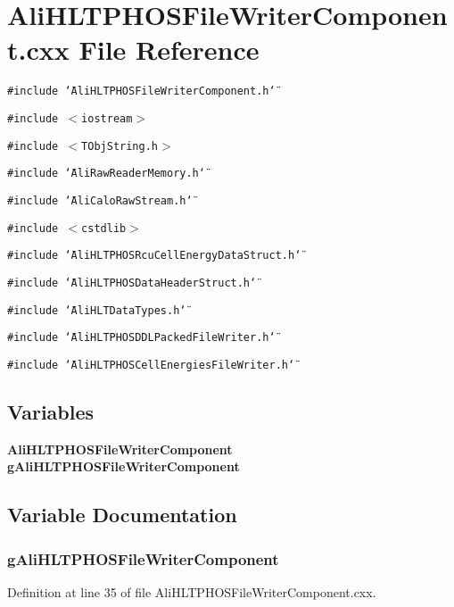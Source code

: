 \section{Ali\-HLTPHOSFile\-Writer\-Component.cxx File Reference}
\label{AliHLTPHOSFileWriterComponent_8cxx}


{\tt \#include \char`\"{}Ali\-HLTPHOSFile\-Writer\-Component.h\char`\"{}}\par
{\tt \#include $<$iostream$>$}\par
{\tt \#include $<$TObj\-String.h$>$}\par
{\tt \#include \char`\"{}Ali\-Raw\-Reader\-Memory.h\char`\"{}}\par
{\tt \#include \char`\"{}Ali\-Calo\-Raw\-Stream.h\char`\"{}}\par
{\tt \#include $<$cstdlib$>$}\par
{\tt \#include \char`\"{}Ali\-HLTPHOSRcu\-Cell\-Energy\-Data\-Struct.h\char`\"{}}\par
{\tt \#include \char`\"{}Ali\-HLTPHOSData\-Header\-Struct.h\char`\"{}}\par
{\tt \#include \char`\"{}Ali\-HLTData\-Types.h\char`\"{}}\par
{\tt \#include \char`\"{}Ali\-HLTPHOSDDLPacked\-File\-Writer.h\char`\"{}}\par
{\tt \#include \char`\"{}Ali\-HLTPHOSCell\-Energies\-File\-Writer.h\char`\"{}}\par
\subsection*{Variables}
\begin{CompactItemize}
\item 
{\bf Ali\-HLTPHOSFile\-Writer\-Component} {\bf g\-Ali\-HLTPHOSFile\-Writer\-Component}
\end{CompactItemize}


\subsection{Variable Documentation}
\subsubsection{ {\bf g\-Ali\-HLTPHOSFile\-Writer\-Component}}\label{AliHLTPHOSFileWriterComponent_8cxx_a0}




Definition at line 35 of file Ali\-HLTPHOSFile\-Writer\-Component.cxx.